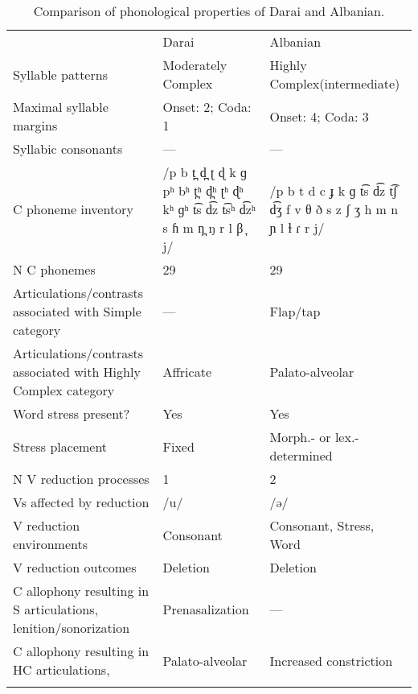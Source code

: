 \begin{table}
\small
\begin{tabularx}{\textwidth}{QQQ}
\lsptoprule
 & {Darai} & {Albanian}\\
 {Syllable patterns} & Moderately Complex & Highly Complex\newline (intermediate)\\
 \midrule 
 {Maximal syllable margins} & Onset: 2; Coda: 1 & Onset: 4; Coda: 3\\
 \tablevspace
 {Syllabic consonants} & — & —\\
 \tablevspace
 {C phoneme inventory} & /p b t̪ d̪ ʈ ɖ k ɡ pʰ bʰ t̪ʰ d̪ʰ ʈʰ ɖʰ kʰ ɡʰ t͡s d͡z t͡sʰ d͡zʰ s ɦ m n̪ ŋ r l β ̞ j/ & /p b t d c ɟ k ɡ t͡s d͡z t͡ʃ d͡ʒ f v θ ð s z ʃ ʒ h m n ɲ l ɫ ɾ r j/\\
 \tablevspace
 {N C phonemes} & 29 & 29\\
 \tablevspace
 {Articulations/contrasts associated with {Simple}} {category} & {—} & {Flap/tap}\\
 \tablevspace
 {Articulations/contrasts associated with {Highly Complex}} {category} & {Affricate} & { {Palato-alveolar}}\\
 \tablevspace
 {Word stress present?} & {Yes} & {Yes}\\
 \tablevspace
 {Stress placement} & {Fixed} & {Morph.- or lex.-determined}\\
 \tablevspace
 {N V reduction processes} & {1} & {2}\\
 \tablevspace
 {Vs affected by reduction}  & {/u/} & {/ə/}\\
 \tablevspace
 {V reduction environments} & {Consonant} & {Consonant, Stress, Word}\\
 \tablevspace
 {V reduction outcomes} & {Deletion} & {Deletion}\\
 \tablevspace
 {C allophony resulting in S articulations, lenition/sonorization} & { {Prenasalization}} & {—}\\
 \tablevspace
{ {C allophony resulting in HC articulations,} } & { {Palato-alveolar}} & {Increased constriction}\\
\lspbottomrule
\end{tabularx}
\caption{\label{tab:8.6}Comparison of phonological properties of Darai and Albanian.}
\end{table}

